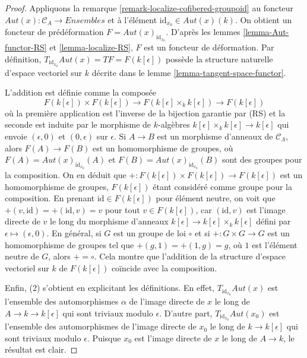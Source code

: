 \begin{proof}
Appliquons la remarque \ref{remark-localize-cofibered-groupoid} au foncteur
$\mathit{Aut}(x) : \mathcal{C}_A \to \textit{Ensembles}$ et à l'élément
$\text{id}_{x_0} \in \mathit{Aut}(x)(k)$. On obtient un foncteur de
prédéformation $F = \mathit{Aut}(x)_{\text{id}_{x_0}}$. D'après les lemmes
\ref{lemma-Aut-functor-RS} et \ref{lemma-localize-RS}, $F$ est un foncteur de
déformation. Par définition,
$T_{\text{id}_{x_0}} \mathit{Aut}(x) = TF = F(k[\epsilon])$
possède la structure naturelle d'espace vectoriel sur $k$ décrite dans le
lemme \ref{lemma-tangent-space-functor}.

\medskip\noindent
L'addition est définie comme la composée
$$
F(k[\epsilon]) \times F(k[\epsilon]) \longrightarrow
F(k[\epsilon] \times_k k[\epsilon]) \longrightarrow
F(k[\epsilon])
$$
où la première application est l'inverse de la bijection garantie par (RS) et
la seconde est induite par le morphisme de $k$-algèbres
$k[\epsilon] \times_k k[\epsilon] \to k[\epsilon]$
qui envoie $(\epsilon, 0)$ et $(0, \epsilon)$ sur $\epsilon$. Si $A \to B$
est un morphisme d'anneaux de $\mathcal{C}_\Lambda$, alors
$F(A) \to F(B)$ est un homomorphisme de groupes, où
$F(A) = \mathit{Aut}(x)_{\text{id}_{x_0}}(A)$ et
$F(B) = \mathit{Aut}(x)_{\text{id}_{x_0}}(B)$ sont des groupes pour la
composition. On en déduit que
$+ : F(k[\epsilon]) \times F(k[\epsilon])\to F(k[\epsilon])$
est un homomorphisme de groupes, $F(k[\epsilon])$ étant considéré comme groupe pour la
composition. En prenant $\text{id} \in F(k[\epsilon])$ pour élément neutre, on
voit que $+(v, \text{id}) =
+(\text{id}, v) = v$ pour tout
$v \in F(k[\epsilon])$, car $(\text{id}, v)$ est l'image directe de $v$ le
long du morphisme d'anneaux
$k[\epsilon] \to k[\epsilon] \times_k k[\epsilon]$ défini par
$\epsilon \mapsto (\epsilon, 0)$. En général, si $G$ est un groupe de loi
$\circ$ et si $+ : G \times G \to G$ est un homomorphisme de groupes tel que
$+(g, 1) = +(1, g) = g$, où $1$ est l'élément neutre de $G$, alors
$+ = \circ$. Cela montre que l'addition de la structure d'espace vectoriel sur
$k$ de $F(k[\epsilon])$ coïncide avec la composition.

\medskip\noindent
Enfin, (2) s'obtient en explicitant les définitions. En effet,
$T_{\text{id}_{x_0}} \mathit{Aut}(x)$ est l'ensemble des automorphismes
$\alpha$ de l'image directe de $x$ le long de $A \to k \to k[\epsilon]$ qui
sont triviaux modulo $\epsilon$. D'autre part,
$T_{\text{id}_{x_0}} \mathit{Aut}(x_0)$ est l'ensemble des automorphismes de
l'image directe de $x_0$ le long de $k \to k[\epsilon]$ qui sont triviaux
modulo $\epsilon$. Puisque $x_0$ est l'image directe de $x$ le long de
$A \to k$, le résultat est clair.
\end{proof}

